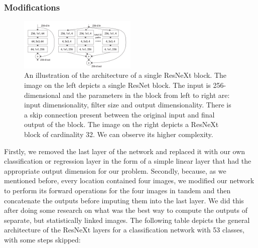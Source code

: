 \documentclass[]{article}
\begin{document}
\hypertarget{modifications}{%
\subsubsection{Modifications}\label{modifications}}

\begin{figure}
\centering
\includegraphics[width=0.5\textwidth,height=\textheight]{./tex2pdf.-3ffa51a14b505aec/7af3369b5dd4839746c46ed6739444ab4e4c1cc1.png}
\caption{An illustration of the architecture of a single ResNeXt block.
The image on the left depicts a single ResNet block. The input is
256-dimensional and the parameters in the block from left to right are:
input dimensionality, filter size and output dimensionality. There is a
skip connection present between the original input and final output of
the block. The image on the right depicts a ResNeXt block of cardinality
32. We can observe its higher complexity.}
\end{figure}

Firstly, we removed the last layer of the network and replaced it with
our own classification or regression layer in the form of a simple
linear layer that had the appropriate output dimension for our problem.
Secondly, because, as we mentioned before, every location contained four
images, we modified our network to perform its forward operations for
the four images in tandem and then concatenate the outputs before
imputing them into the last layer. We did this after doing some research
on what was the best way to compute the outputs of separate, but
statistically linked images. The following table depicts the general
architecture of the ResNeXt layers for a classification network with 53
classes, with some steps skipped:
\end{document}
